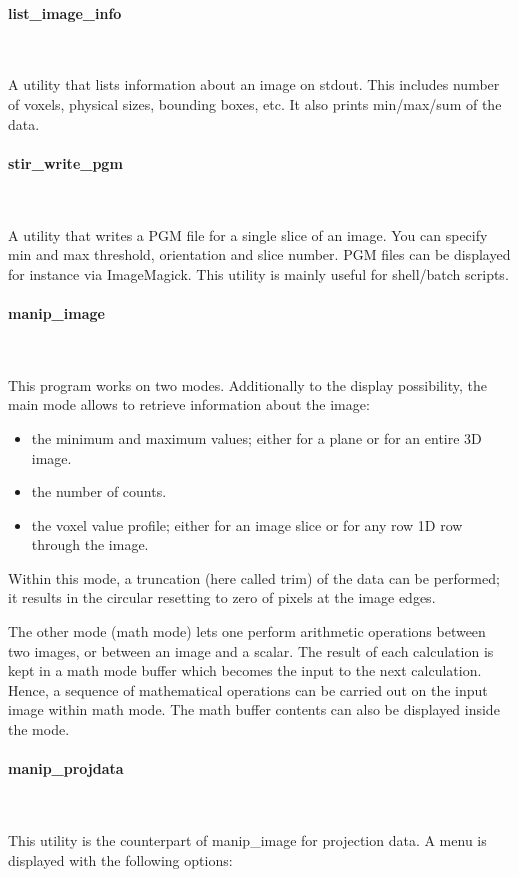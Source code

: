 \documentclass{article}
\newcommand{\subsubsubsection}[1]{\paragraph{#1}\mbox{} \\}
\begin{document}
{{{{ \subsubsubsection{list\_image\_info}
}

A utility that lists information about an image on stdout. This includes number of voxels,
physical sizes, bounding boxes, etc. It also prints min/max/sum of the data. 

{ \subsubsubsection{stir\_write\_pgm}
}

A utility that writes a PGM file for a single slice of an image. You can specify min and max threshold,
orientation and slice number. PGM files can be displayed for instance via ImageMagick.
This utility is mainly useful for shell/batch scripts.

{ \subsubsubsection{manip\_image}
}

This program works on two modes. Additionally to the display 
possibility, the main mode allows to retrieve information about 
the image:

\begin{itemize}
\item the minimum and maximum values; either for a plane or for an 
entire 3D image.
\item the number of counts.
\item the voxel value profile; either for an image slice or for any 
row 1D row through the image.
\end{itemize}
Within this mode, a truncation (here called trim) of the data 
can be performed; it results in the circular resetting to zero 
of pixels at the image edges.


The other mode (math mode) lets one perform arithmetic operations 
between two images, or between an image and a scalar. The result 
of each calculation is kept in a math mode buffer which becomes 
the input to the next calculation. Hence, a sequence of mathematical 
operations can be carried out on the input image within math 
mode. The math buffer contents can also be displayed inside the 
mode.

{ \subsubsubsection{manip\_projdata}
}

This utility is the counterpart of manip\_image for projection 
data. A menu is displayed with the following options:

}}}
\end{document}
